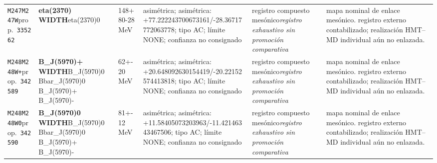 \begin{landscape}
\begin{longtable}{L{1.85cm}L{4.45cm}L{2.35cm}L{4.05cm}L{3.35cm}L{7.15cm}}
\texttt{M247}\newline \texttt{M247W}\newline prop.\ \texttt{335262} & \textbf{eta(2370) WIDTH}\newline eta(2370)0 & 148+80-28\,MeV & asimétrica; asimétrica: +77.222243700673161/-28.36717772063778; tipo AC; límite NONE; confianza no consignado & registro compuesto mesónico\newline \emph{registro exhaustivo sin promoción comparativa} & mapa nominal de enlace mesónico. registro externo contabilizado; realización HMT--MD individual aún no enlazada. \\
\texttt{M248}\newline \texttt{M248W+}\newline prop.\ \texttt{342589} & \textbf{B\_\allowbreak{}J(5970)+ WIDTH}\newline B\_\allowbreak{}J(5970)0 \textbar{}\allowbreak{} Bbar\_\allowbreak{}J(5970)0 \textbar{}\allowbreak{} B\_\allowbreak{}J(5970)+ \textbar{}\allowbreak{} B\_\allowbreak{}J(5970)- & 62+-20\,MeV & asimétrica; asimétrica: +20.648092630154419/-20.22152574413818; tipo AC; límite NONE; confianza no consignado & registro compuesto mesónico\newline \emph{registro exhaustivo sin promoción comparativa} & mapa nominal de enlace mesónico. registro externo contabilizado; realización HMT--MD individual aún no enlazada. \\
\texttt{M248}\newline \texttt{M248W0}\newline prop.\ \texttt{342590} & \textbf{B\_\allowbreak{}J(5970)0 WIDTH}\newline B\_\allowbreak{}J(5970)0 \textbar{}\allowbreak{} Bbar\_\allowbreak{}J(5970)0 \textbar{}\allowbreak{} B\_\allowbreak{}J(5970)+ \textbar{}\allowbreak{} B\_\allowbreak{}J(5970)- & 81+-12\,MeV & asimétrica; asimétrica: +11.58405073203963/-11.42146343467506; tipo AC; límite NONE; confianza no consignado & registro compuesto mesónico\newline \emph{registro exhaustivo sin promoción comparativa} & mapa nominal de enlace mesónico. registro externo contabilizado; realización HMT--MD individual aún no enlazada. \\

\end{longtable}
\end{landscape}
